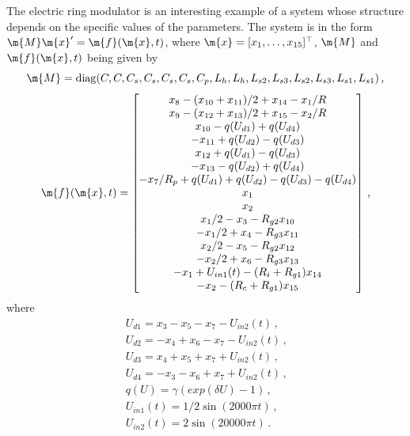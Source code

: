 The electric ring modulator is an interesting example of a system whose structure depends on the specific values of the parameters. The system is in the form $\m{M}\m{x}^\prime = \m{f}(\m{x},t)$, where $\m{x} = [x_1, \dots, x_{15}]^\top$, $\m{M}$ and $\m{f}(\m{x},t)$ being given by
%
\begin{equation}
  \m{M} = \mathrm{diag}(C, C, C_s, C_s, C_s, C_s, C_p, L_h, L_h, L_{s2}, L_{s3}, L_{s2}, L_{s3}, L_{s1}, L_{s1}) \, \text{,}
\end{equation}
%
\begin{equation}
  \m{f}(\m{x},t) = \begin{bmatrix}
    x_8 - (x_{10} + x_{11})/2 + x_{14} - x_1/R \\
    x_9 - (x_{12} + x_{13})/2 + x_{15} - x_2/R \\
    x_{10} - q(U_{d1}) + q(U_{d4}) \\
    -x_{11} + q(U_{d2}) - q(U_{d3}) \\
    x_{12} + q(U_{d1}) - q(U_{d3}) \\
    -x_{13} - q(U_{d2}) + q(U_{d4}) \\
    -x_7/R_p + q(U_{d1}) + q(U_{d2}) - q(U_{d3}) - q(U_{d4}) \\
    x_1 \\
    x_2 \\
    x_1/2 - x_3 - R_{g2}x_{10} \\
    -x_1/2 + x_4 - R_{g3}x_{11} \\
    x_2/2 - x_5 - R_{g2}x_{12} \\
    -x_2/2 + x_6 - R_{g3}x_{13} \\
    -x_1 + U_{in1}(t) - (R_i + R_{g1})x_{14} \\
    -x_2 - (R_c+R_{g1})x_{15}
  \end{bmatrix} \, \text{,}
\end{equation}
%
where
%
\begin{equation*}
  \begin{array}{l}
    U_{d1} = x_3 - x_5 - x_7 - U_{in2}(t) \, \text{,} \\
    U_{d2} = -x_4 + x_6 - x_7 - U_{in2}(t) \, \text{,} \\
    U_{d3} = x_4 + x_5 + x_7 + U_{in2}(t) \, \text{,} \\
    U_{d4} = -x_3 - x_6 + x_7 + U_{in2}(t) \, \text{,} \\
    q(U) = \gamma(exp(\delta U) - 1) \, \text{,} \\
    U_{in1}(t) = 1/2 \sin(2000 \pi t) \, \text{,} \\
    U_{in2}(t) = 2 \sin(20000 \pi t) \, \text{.}
  \end{array}
\end{equation*}

